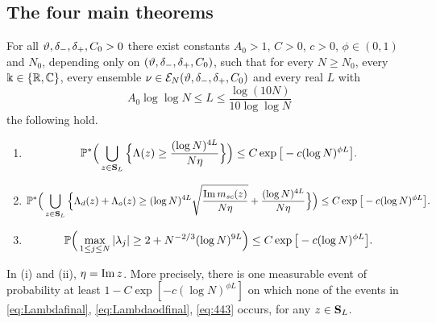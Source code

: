 \subsection{The four main theorems}

\begin{theorem}\label{thm:21}
For all $\vartheta,\delta_-,\delta_+,C_0>0$ there exist constants $A_0>1$, $C>0$, $c>0$, $\phi\in(0,1)$ and $N_0$, depending only on
$(\vartheta,\delta_-,\delta_+,C_0)$, such that for every $N\ge N_0$, every $\Bbbk\in\{\mathbb{R},\mathbb{C}\}$, every ensemble
$\nu\in\mathcal E_N(\vartheta,\delta_-,\delta_+,C_0)$ and every real $L$ with
\begin{equation}\label{eq:Lbound}
 A_0\log\log N\le L\le\frac{\log(10N)}{10\log\log N}
\end{equation}
the following hold.
\begin{enumerate}[label=\textup{(\roman*)},leftmargin=2.2em]
\item
\begin{equation}\label{eq:Lambdafinal}
 \mathbb{P}^*\Big(\bigcup_{z\in\mathbf{S}_L}\Big\{\Lambda(z)\ge\frac{(\log N)^{4L}}{N\eta}\Big\}\Big)\le C\exp\big[-c(\log N)^{\phi L}\big].
\end{equation}
\item
\begin{equation}\label{eq:Lambdaodfinal}
 \mathbb{P}^*\Big(\bigcup_{z\in\mathbf{S}_L}\Big\{\Lambda_d(z)+\Lambda_o(z)\ge(\log N)^{4L}\sqrt{\frac{\operatorname{Im}m_{sc}(z)}{N\eta}}+\frac{(\log N)^{4L}}{N\eta}\Big\}\Big)\le C\exp\big[-c(\log N)^{\phi L}\big].
\end{equation}
\item
\begin{equation}\label{eq:443}
 \mathbb{P}\Big(\max_{1\le j\le N}|\lambda_j|\ge2+N^{-2/3}(\log N)^{9L}\Big)\le C\exp\big[-c(\log N)^{\phi L}\big].
\end{equation}
\end{enumerate}
In \textup{(i)} and \textup{(ii)}, $\eta=\operatorname{Im} z$. More precisely, there is one measurable event of probability at least $1-C\exp[-c(\log N)^{\phi L}]$ on which none of the events in
\eqref{eq:Lambdafinal}, \eqref{eq:Lambdaodfinal}, \eqref{eq:443} occurs, for any $z\in\mathbf{S}_L$.
\end{theorem}

